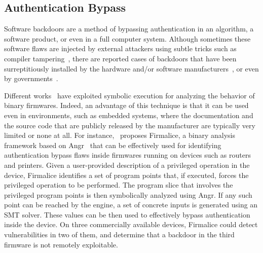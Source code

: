 \vspace{-1mm} %
\subsection{Authentication Bypass}
\label{ss:auth-bypass}
Software backdoors are a method of bypassing authentication in an algorithm, a software product, or even in a full computer system. Although sometimes these software flaws are injected by external attackers using subtle tricks such as compiler tampering~\cite{KRS-TR74}, there are reported cases of backdoors that have been surreptitiously installed by the hardware and/or software manufacturers~\cite{CZF-USEC14}, or even by governments~\cite{NSA-BACKDOOR}. 

Different works~\cite{DMR-USEC13,ZBF-NDSS14,FIRMALICE-NDSS15} have exploited symbolic execution for analyzing the behavior of binary firmwares. Indeed, an advantage of this technique is that it can be used even in environments, such as embedded systems, where the documentation and the source code that are publicly released by the manufacturer are typically very limited or none at all. For instance,~\cite{FIRMALICE-NDSS15} proposes Firmalice, a binary analysis framework based on {\sc Angr}~\cite{ANGR-SSP16} that can be effectively used for identifying authentication bypass flaws inside firmwares running on devices such as routers and printers. Given a user-provided description of a privileged operation in the device, Firmalice identifies a set of program points that, if executed, forces the privileged operation to be performed. The program slice that involves the privileged program points is then symbolically analyzed using {\sc Angr}. If any such point can be reached by the engine, a set of concrete inputs is generated using an SMT solver. These values can be then used to effectively bypass authentication inside the device. On three commercially available devices, Firmalice could detect vulnerabilities in two of them, and determine that a backdoor in the third firmware is not remotely exploitable.